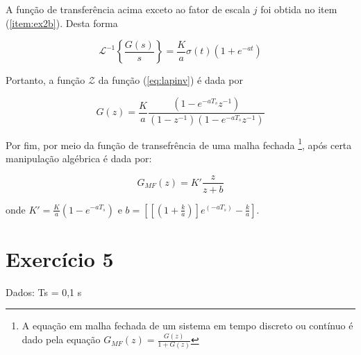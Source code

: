 \documentclass{article}
\begin{document}
A função de transferência acima exceto ao fator de escala $j$ foi obtida no item (\ref{item:ex2b}). Desta forma

\begin{equation}
\label{eq:lapinv}
\mathcal{L}^{-1}\left\{\frac{G(s)}{s}\right\} = \frac{K}{a}\sigma(t)\left(1+e^{-at}\right)
\end{equation}

Portanto, a função $\mathcal{Z}$ da função (\ref{eq:lapinv}) é dada por

\begin{equation}
G(z) = \frac{K}{a} \frac{(1 - e^{-aT_s}z^{-1})}{(1-z^{-1})(1 - e^{-aT_s}z^{-1})}
\end{equation}

Por fim, por meio da função de transefrência de uma malha fechada \footnote{A equação em malha fechada de um sistema em tempo discreto ou contínuo é dado pela equação $G_{MF}(z) = \frac{G(z)}{1+G(z)}$}, após certa manipulação algébrica é dada por:

\begin{equation}
G_{MF}(z) = K' \frac{z}{z+b}
\end{equation}

onde $K' = \frac{K}{a} (1-e^{-aT_s}) \mbox{ e } b = \left[\left[(1 + \frac{k}{a})\right]e^(-aT_s) - \frac{k}{a} \right] $.

\section*{Exercício 5} Dados: Ts = 0,1 s
\end{document}
